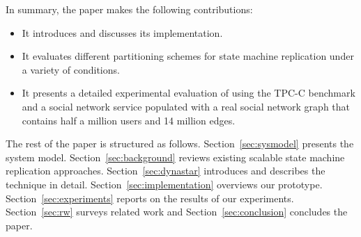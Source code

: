 In summary, the paper makes the following contributions:
\begin{itemize}
\item It introduces \dynastar and discusses its implementation. 
\item It evaluates different partitioning schemes for state machine replication under a variety of conditions.
\item It presents a detailed experimental evaluation of \dynastar using the TPC-C benchmark and a social network service populated with a real social network graph that contains half a million users and 14 million edges.
\end{itemize}


The rest of the paper is structured as follows.
Section~\ref{sec:sysmodel} presents the system model.
Section~\ref{sec:background} reviews existing scalable state machine replication approaches.
Section~\ref{sec:dynastar} introduces \dynastar and describes the technique in detail.
Section~\ref{sec:implementation} overviews our prototype.
Section~\ref{sec:experiments} reports on the results of our experiments.
Section~\ref{sec:rw} surveys related work and
Section~\ref{sec:conclusion} concludes the paper.
